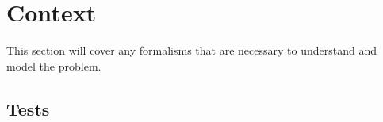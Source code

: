 \section{Context}
\label{sec:context}


This section will cover any formalisms that are necessary to understand and model the problem.

\subsection{\Flaky{} Tests}
\label{sec:sec:flaky_tests}


